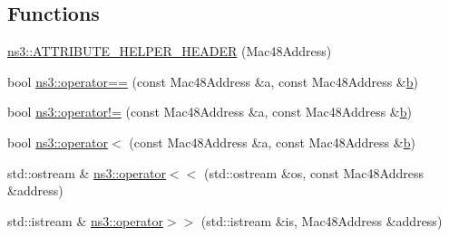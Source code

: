 \subsection*{Functions}
\begin{DoxyCompactItemize}
\item 
\hyperlink{namespacens3_a004d8246de7d25bfba7ebb3acd31e6de}{ns3\+::\+A\+T\+T\+R\+I\+B\+U\+T\+E\+\_\+\+H\+E\+L\+P\+E\+R\+\_\+\+H\+E\+A\+D\+ER} (Mac48\+Address)
\item 
bool \hyperlink{namespacens3_a5c323a97d9fb29155482629da9ea666f}{ns3\+::operator==} (const Mac48\+Address \&a, const Mac48\+Address \&\hyperlink{lte__pathloss_8m_a21ad0bd836b90d08f4cf640b4c298e7c}{b})
\item 
bool \hyperlink{namespacens3_adb4b8a81cfa30b861965216b80005ec6}{ns3\+::operator!=} (const Mac48\+Address \&a, const Mac48\+Address \&\hyperlink{lte__pathloss_8m_a21ad0bd836b90d08f4cf640b4c298e7c}{b})
\item 
bool \hyperlink{namespacens3_a814f341a7c102fbe7e4bdf6313cda887}{ns3\+::operator$<$} (const Mac48\+Address \&a, const Mac48\+Address \&\hyperlink{lte__pathloss_8m_a21ad0bd836b90d08f4cf640b4c298e7c}{b})
\item 
std\+::ostream \& \hyperlink{namespacens3_aef1e371de8496ececd7c572e93be00ce}{ns3\+::operator$<$$<$} (std\+::ostream \&os, const Mac48\+Address \&address)
\item 
std\+::istream \& \hyperlink{namespacens3_a8463d7d59e31b87a21b43f176651d9fe}{ns3\+::operator$>$$>$} (std\+::istream \&is, Mac48\+Address \&address)
\end{DoxyCompactItemize}
